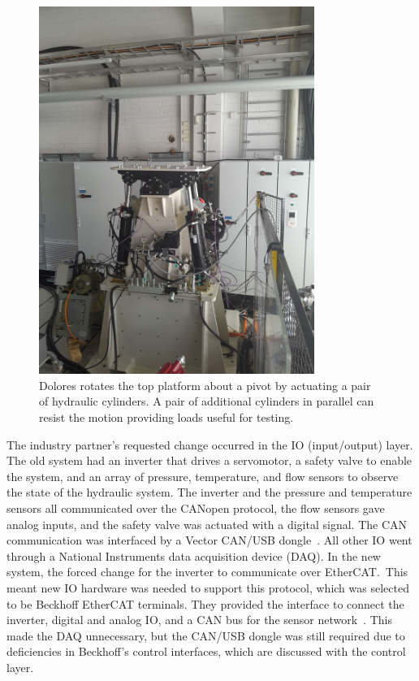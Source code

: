 \documentclass[english,12pt,a4paper,pdftex,eng,utf8]{aaltothesis}
\begin{document}
\begin{figure}[h]
  \centering
  \includegraphics[width=0.8\textwidth]{assets/dolores}
  \caption{Dolores rotates the top platform about a pivot by actuating a pair of hydraulic cylinders.  A pair of additional cylinders in parallel can resist the motion providing loads useful for testing.}\label{fig:dolores0}
\end{figure}

The industry partner's requested change occurred in the IO (input/output) layer. The old system had an inverter that drives a servomotor, a safety valve to enable the system, and an array of pressure, temperature, and flow sensors to observe the state of the hydraulic system. The inverter and the pressure and temperature sensors all communicated over the CANopen protocol, the flow sensors gave analog inputs, and the safety valve was actuated with a digital signal. The CAN communication was interfaced by a Vector CAN/USB dongle~\cite{VectorCanUsbDongle}. All other IO went through a National Instruments data acquisition device (DAQ). In the new system, the forced change for the inverter to communicate over EtherCAT.\ This meant new IO hardware was needed to support this protocol, which was selected to be Beckhoff EtherCAT terminals. They provided the interface to connect the inverter, digital and analog IO, and a CAN bus for the sensor network~\cite{BeckhoffEL6751}. This made the DAQ unnecessary, but the CAN/USB dongle was still required due to deficiencies in Beckhoff's control interfaces, which are discussed with the control layer.
\end{document}
